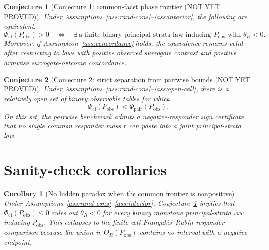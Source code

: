 \documentclass[11pt]{article}
\theoremstyle{definition}
\theoremstyle{plain}
\newtheorem{conjecture}{Conjecture}
\newtheorem{corollary}{Corollary}
\theoremstyle{remark}
\begin{document}
\begin{conjecture}[Conjecture 1: common-facet phase frontier (NOT YET PROVED)]\label{conj:phase-frontier}
Under Assumptions~\ref{ass:rand-cons}--\ref{ass:interior}, the following are equivalent:
\[
  \Phi_{\mathrm{cf}}(P_{\mathrm{obs}})>0
  \quad\Longleftrightarrow\quad
  \exists\ \text{a finite binary principal-strata law inducing }P_{\mathrm{obs}}
  \text{ with }\theta_R<0 .
\]
Moreover, if Assumption~\ref{ass:concordance} holds, the equivalence remains valid after restricting to laws with positive observed surrogate contrast and positive armwise surrogate-outcome concordance.
\end{conjecture}

\begin{conjecture}[Conjecture 2: strict separation from pairwise bounds (NOT YET PROVED)]\label{conj:pairwise-strict}
Under Assumptions~\ref{ass:rand-cons}--\ref{ass:open-cell}, there is a relatively open set of binary observable tables for which
\[
  \Phi_{\mathrm{cf}}(P_{\mathrm{obs}})<\Phi_{\mathrm{pair}}(P_{\mathrm{obs}}).
\]
On this set, the pairwise benchmark admits a negative-responder sign certificate that no single common responder mass \(r\) can paste into a joint principal-strata law.
\end{conjecture}

\section{Sanity-check corollaries}
\begin{corollary}[No hidden paradox when the common frontier is nonpositive]\label{cor:no-paradox}
Under Assumptions~\ref{ass:rand-cons}--\ref{ass:interior}, Conjecture~\ref{conj:phase-frontier} implies that \(\Phi_{\mathrm{cf}}(P_{\mathrm{obs}})\le0\) rules out \(\theta_R<0\) for every binary monotone principal-strata law inducing \(P_{\mathrm{obs}}\). This collapses to the finite-cell Frangakis--Rubin responder comparison because the union in \(\Theta_R(P_{\mathrm{obs}})\) contains no interval with a negative endpoint.
\end{corollary}
\end{document}
